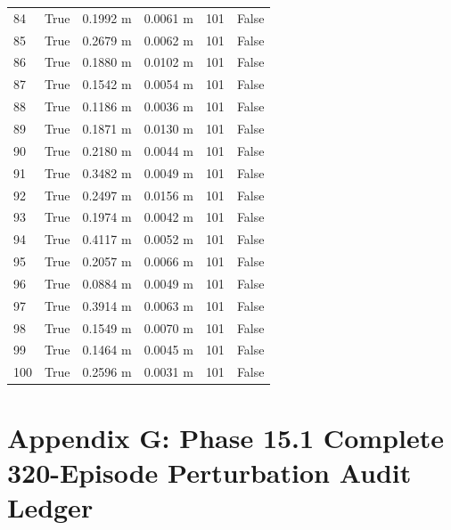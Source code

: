 \documentclass[11pt,a4paper,oneside]{book}
\begin{document}
\begin{longtable}{l l l l l l}
84 & True & 0.1992 m & 0.0061 m & 101 & False \\
85 & True & 0.2679 m & 0.0062 m & 101 & False \\
86 & True & 0.1880 m & 0.0102 m & 101 & False \\
87 & True & 0.1542 m & 0.0054 m & 101 & False \\
88 & True & 0.1186 m & 0.0036 m & 101 & False \\
89 & True & 0.1871 m & 0.0130 m & 101 & False \\
90 & True & 0.2180 m & 0.0044 m & 101 & False \\
91 & True & 0.3482 m & 0.0049 m & 101 & False \\
92 & True & 0.2497 m & 0.0156 m & 101 & False \\
93 & True & 0.1974 m & 0.0042 m & 101 & False \\
94 & True & 0.4117 m & 0.0052 m & 101 & False \\
95 & True & 0.2057 m & 0.0066 m & 101 & False \\
96 & True & 0.0884 m & 0.0049 m & 101 & False \\
97 & True & 0.3914 m & 0.0063 m & 101 & False \\
98 & True & 0.1549 m & 0.0070 m & 101 & False \\
99 & True & 0.1464 m & 0.0045 m & 101 & False \\
100 & True & 0.2596 m & 0.0031 m & 101 & False \\
\bottomrule \end{longtable}
\chapter{Appendix G: Phase 15.1 Complete 320-Episode Perturbation Audit Ledger}
\end{document}
